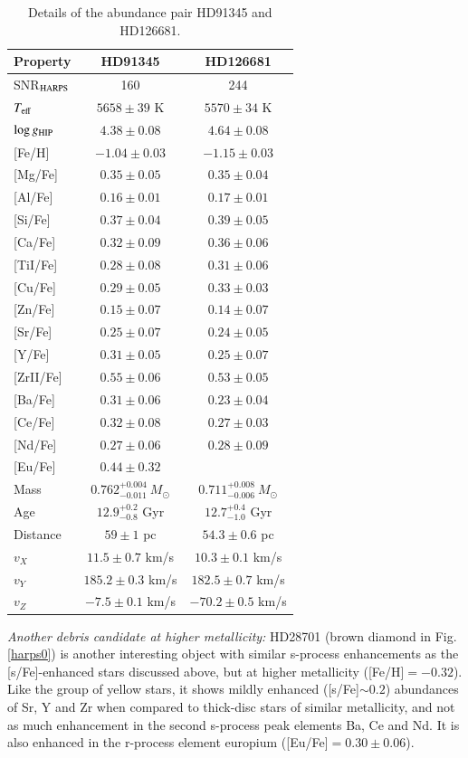 \documentclass{aa}  %
\begin{document}
\begin{table}
\label{twintable}
\centering
\caption{Details of the abundance pair HD91345 and HD126681.}
\begin{tabular}{lcc}
Property & HD91345 & HD126681 \\
\hline \hline
SNR$_{\rm HARPS}$ & 160 & 244 \\
$T_{\rm eff}$ & $5658\pm39$ K & $5570\pm34$ K \\
$\log g_{\rm HIP}$ & $4.38\pm0.08$ & $4.64\pm0.08$ \\
{[Fe/H]  }& $-1.04\pm0.03$ & $-1.15\pm0.03$ \\
{[Mg/Fe] }& $0.35\pm0.05$ & $0.35\pm0.04$ \\
{[Al/Fe] }& $0.16\pm0.01$ & $0.17\pm0.01$ \\
{[Si/Fe] }& $0.37\pm0.04$ & $0.39\pm0.05$ \\
{[Ca/Fe] }& $0.32\pm0.09$ & $0.36\pm0.06$ \\
{[TiI/Fe]} & $0.28\pm0.08$ & $0.31\pm0.06$ \\
{[Cu/Fe] }& $0.29\pm0.05$ & $0.33\pm0.03$ \\
{[Zn/Fe] }& $0.15\pm0.07$ & $0.14\pm0.07$ \\
{[Sr/Fe] }& $0.25\pm0.07$ & $0.24\pm0.05$ \\
{[Y/Fe]  }& $0.31\pm0.05$ & $0.25\pm0.07$ \\
{[ZrII/Fe]} & $0.55\pm0.06$ & $0.53\pm0.05$ \\
{[Ba/Fe]} & $0.31\pm0.06$ & $0.23\pm0.04$ \\
{[Ce/Fe]} & $0.32\pm0.08$ & $0.27\pm0.03$ \\
{[Nd/Fe]} & $0.27\pm0.06$ & $0.28\pm0.09$ \\
{[Eu/Fe]} & $0.44\pm0.32$ &  \\
\hline
Mass & $0.762^{+0.004}_{-0.011}\ M_{\odot}$  & $0.711^{+0.008}_{-0.006}\ M_{\odot}$ \\
Age & $12.9^{+0.2}_{-0.8}$ Gyr & $12.7^{+0.4}_{-1.0}$ Gyr \\
Distance & $59\pm1$ pc & $54.3\pm0.6$ pc\\
$v_X$ & $11.5\pm0.7$ km/s & $10.3\pm0.1$ km/s \\
$v_Y$ & $185.2\pm0.3$ km/s & $182.5\pm0.7$ km/s \\
$v_Z$ & $-7.5\pm0.1$ km/s & $-70.2\pm0.5$ km/s \\
\hline\hline
\end{tabular}
\end{table}

{\it Another debris candidate at higher metallicity:} HD28701 (brown diamond in Fig. \ref{harps0}) is another interesting object with similar s-process enhancements as the [s/Fe]-enhanced stars discussed above, but at higher metallicity ([Fe/H]$=-0.32$). Like the group of yellow stars, it shows mildly enhanced ([s/Fe]$\sim0.2$) abundances of Sr, Y and Zr when compared to thick-disc stars of similar metallicity, and not as much enhancement in the second s-process peak elements Ba, Ce and Nd. It is also enhanced in the r-process element europium ([Eu/Fe]$=0.30\pm0.06$). 
\end{document}
